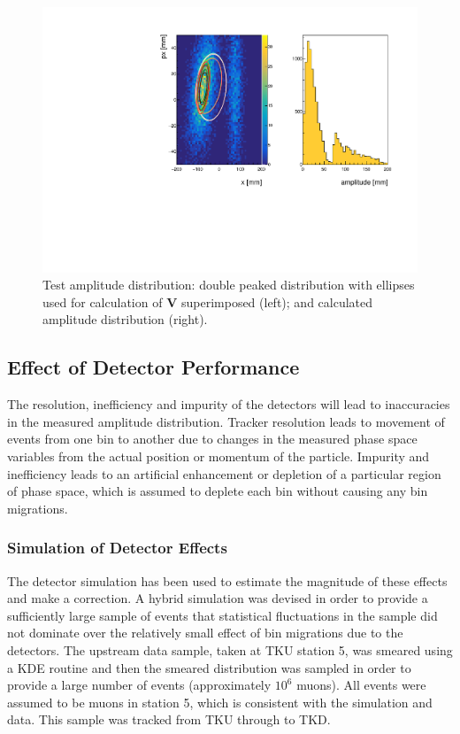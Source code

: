 \begin{figure}[!tbh]
    \centering
    \includegraphics*[width=\textwidth]{05-Results/Figures/TestAmplitudeBinned.pdf}
    \caption{Test amplitude distribution: double peaked distribution with
    ellipses used for calculation of $\mathbf{V}$ superimposed (left); and
    calculated amplitude distribution (right).\label{fig:test_amplitude}}
\end{figure}

\subsection{Effect of Detector Performance}

The resolution, inefficiency and impurity of the detectors will lead to 
inaccuracies in the measured amplitude distribution. Tracker resolution leads to 
movement of events from 
one bin to another due to changes in the measured phase space variables from the
actual position or momentum of the particle. Impurity and 
inefficiency leads to an artificial enhancement or depletion of a particular region
of phase space, which is assumed to deplete each bin without causing any bin
migrations.

\subsubsection{Simulation of Detector Effects}
The detector simulation has been used to estimate the magnitude of these effects 
and make a correction. A hybrid simulation was devised in order to provide a sufficiently
large sample of events that statistical fluctuations in the sample did not
dominate over the relatively small effect of bin migrations due to the detectors.
The upstream data sample, taken at TKU station 5, was smeared using a KDE routine 
\cite{kde} and then the smeared distribution was sampled in order to provide a 
large number of events (approximately $10^6$ muons). All events were assumed to be 
muons in station 5, which is consistent with the simulation and data. This 
sample was tracked from TKU through to TKD.

